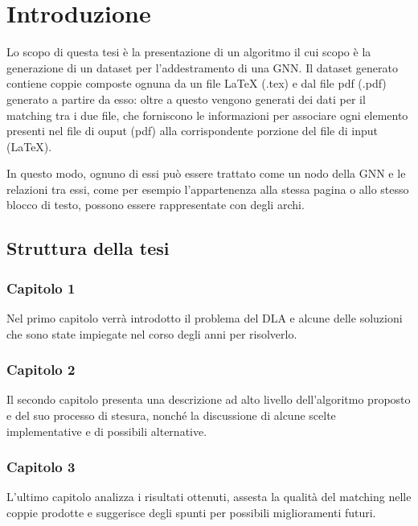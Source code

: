\chapter*{Introduzione}
Lo scopo di questa tesi è la presentazione di un algoritmo il cui scopo è la generazione di un dataset per l'addestramento di una GNN. 
Il dataset generato contiene coppie composte ognuna da un file LaTeX (.tex) e dal file pdf (.pdf) generato a partire da esso: 
oltre a questo vengono generati dei dati per il matching tra i due file, che forniscono le informazioni per associare
ogni elemento presenti nel file di ouput (pdf) alla corrispondente porzione del file di input (LaTeX).

In questo modo, ognuno di essi può essere trattato come un nodo della GNN e le relazioni tra essi, come per esempio l'appartenenza
alla stessa pagina o allo stesso blocco di testo, possono essere rappresentate con degli archi.

\section*{Struttura della tesi}
    \subsection*{Capitolo 1}
    Nel primo capitolo verrà introdotto il problema del DLA e alcune delle soluzioni che sono state impiegate nel corso degli anni per risolverlo.

    \subsection*{Capitolo 2}
    Il secondo capitolo presenta una descrizione ad alto livello dell'algoritmo proposto e del suo processo di stesura, nonché la discussione di
    alcune scelte implementative e di possibili alternative.

    \subsection*{Capitolo 3}
    L'ultimo capitolo analizza i risultati ottenuti, assesta la qualità del matching nelle coppie prodotte e suggerisce degli spunti per possibili miglioramenti futuri. 